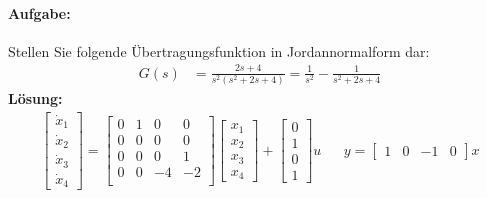 \paragraph{Aufgabe:}
Stellen Sie folgende Übertragungsfunktion in Jordannormalform dar:
\begin{align*}
	G(s) &=  \frac{2s+4}{s^2(s^2+2s+4)} = \frac{1}{s^2} - \frac{1}{s^2+2s+4}
\end{align*}
\textbf{Lösung:}
\begin{align*}
	\begin{bmatrix}
	\dot{x}_1\\\dot{x}_2\\\dot{x}_3\\\dot{x}_4
		\end{bmatrix} = \left[\begin{array}{cc|cc}
		0&1&0&0\\
		0&0&0&0\\\hline
		0&0&0&1\\
		0&0&-4&-2\\
		\end{array}\right]\begin{bmatrix}
		x_1\\x_2\\x_3\\x_4
		\end{bmatrix} + \begin{bmatrix}
			0\\1\\0\\1
		\end{bmatrix}u && y = \begin{bmatrix}
		1 &0&-1&0
		\end{bmatrix}x
\end{align*}
